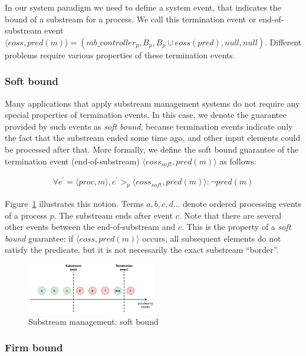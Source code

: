In our system paradigm we need to define a system event, that indicates the bound of a substream for a process. We call this termination event or end-of-substream event
$\langle eoss, pred(m)\rangle = (mb\_controller_p, B_p, B_p\cup eoss(pred), null, null)$. Different problems require various properties of these termination events.

\subsubsection{Soft bound}

Many applications that apply substream management systems do not require any special properties of termination events. In this case, we denote the guarantee provided by such events as {\em soft bound}, because termination events indicate only the fact that the substream ended some time ago, and other input elements could be processed after that. More formally, we define the soft bound guarantee of the termination event (end-of-substream) $\langle eoss_{soft}, pred(m)\rangle$ as follows:

\begin{align*}
\forall e^{'} = \langle proc,m\rangle, e^{'} >_p \langle eoss_{soft}, pred(m)\rangle : \neg pred(m)
\end{align*}

Figure~\ref{general_guarantees} illustrates this notion. Terms $a,b,c,d...$ denote ordered processing events of a process $p$. The substream ends after event $c$. Note that there are several other events between the end-of-substream and $c$. This is the property of a {\em soft bound} guarantee: if $\langle eoss, pred(m)\rangle$ occurs, all subsequent elements do not satisfy the predicate, but it is not necessarily the exact substream ``border''.

\begin{figure}[htbp]
  \centering
  \includegraphics[width=0.50\textwidth]{pics/general-guarantee.pdf}
  \caption{Substream management: soft bound}
  \label{general_guarantees}
\end{figure}

\subsubsection{Firm bound}

